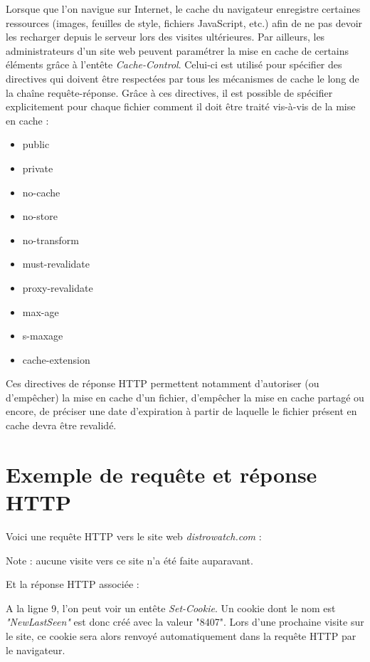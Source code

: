 Lorsque que l'on navigue sur Internet, le cache du navigateur enregistre certaines ressources (images, feuilles de style, fichiers JavaScript, etc.) afin de ne pas devoir les recharger depuis le serveur lors des visites ultérieures. Par ailleurs, les administrateurs d'un site web peuvent paramétrer la mise en cache de certains éléments grâce à l'entête \textit{Cache-Control}. Celui-ci est utilisé pour spécifier des directives qui doivent être respectées par tous les mécanismes de cache le long de la chaîne requête-réponse. Grâce à ces directives, il est possible de spécifier explicitement pour chaque fichier comment il doit être traité vis-à-vis de la mise en cache \cite{IETF_RFC2616} :
\begin{multicols}{2}
\begin{itemize}
  \item public
  \item private
  \item no-cache
  \item no-store
  \item no-transform
  \item must-revalidate
  \item proxy-revalidate
  \item max-age
  \item s-maxage
  \item cache-extension
\end{itemize}
\end{multicols}

Ces directives de réponse HTTP permettent notamment d'autoriser (ou d'empêcher) la mise en cache d'un fichier, d'empêcher la mise en cache partagé ou encore, de préciser une date d'expiration à partir de laquelle le fichier présent en cache devra être revalidé.

\section{Exemple de requête et réponse HTTP}
\label{http_request_example}
Voici une requête HTTP vers le site web \textit{distrowatch.com} :

Note : aucune visite vers ce site n'a été faite auparavant.
\newpage

Et la réponse HTTP associée :


A la ligne 9, l'on peut voir un entête \textit{Set-Cookie}. Un cookie dont le nom est \textit{"NewLastSeen"} est donc créé avec la valeur "8407". Lors d'une prochaine visite sur le site, ce cookie sera alors renvoyé automatiquement dans la requête HTTP par le navigateur.

